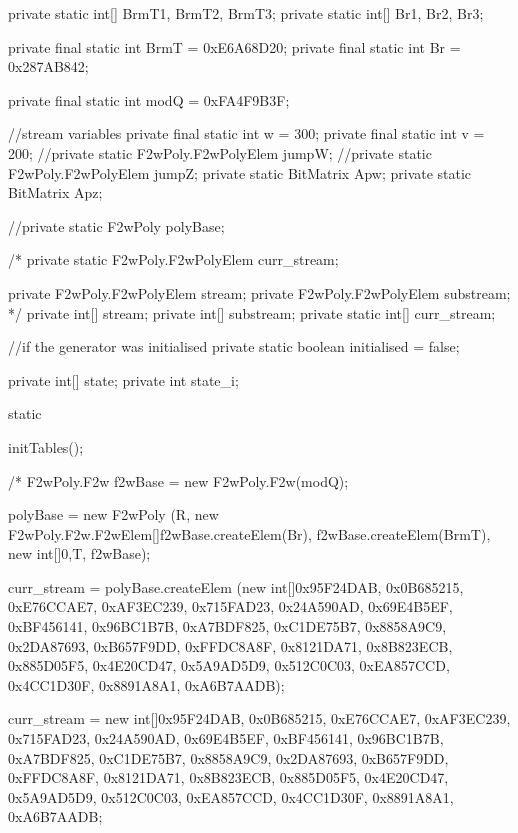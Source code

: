 \begin{code}
\begin{hide}
{   private static int[] BrmT1, BrmT2, BrmT3;
   private static int[] Br1, Br2, Br3;


   private final static int BrmT = 0xE6A68D20;
   private final static int Br = 0x287AB842;

   private final static int modQ = 0xFA4F9B3F;

   //stream variables
   private final static int w = 300;
   private final static int v = 200;
   //private static F2wPoly.F2wPolyElem jumpW;
   //private static F2wPoly.F2wPolyElem jumpZ;
   private static BitMatrix Apw;
   private static BitMatrix Apz;

   //private static F2wPoly polyBase;

   /*
   private static F2wPoly.F2wPolyElem curr_stream;

   private F2wPoly.F2wPolyElem stream;
   private F2wPoly.F2wPolyElem substream;
   */
   private int[] stream;
   private int[] substream;
   private static int[] curr_stream;

   //if the generator was initialised
   private static boolean initialised = false;

   private int[] state;
   private int state_i;


   static
   {
      initTables();

      /*
      F2wPoly.F2w f2wBase = new F2wPoly.F2w(modQ);

      polyBase = new F2wPoly
                 (R, new F2wPoly.F2w.F2wElem[]{f2wBase.createElem(Br),
                                               f2wBase.createElem(BrmT)},
                  new int[]{0,T}, f2wBase);


      curr_stream = polyBase.createElem
                    (new int[]{0x95F24DAB, 0x0B685215, 0xE76CCAE7, 0xAF3EC239,
                               0x715FAD23, 0x24A590AD, 0x69E4B5EF, 0xBF456141,
                               0x96BC1B7B, 0xA7BDF825, 0xC1DE75B7, 0x8858A9C9,
                               0x2DA87693, 0xB657F9DD, 0xFFDC8A8F, 0x8121DA71,
                               0x8B823ECB, 0x885D05F5, 0x4E20CD47, 0x5A9AD5D9,
                               0x512C0C03, 0xEA857CCD, 0x4CC1D30F, 0x8891A8A1,
                               0xA6B7AADB});

      curr_stream = new int[]{0x95F24DAB, 0x0B685215, 0xE76CCAE7, 0xAF3EC239,
                              0x715FAD23, 0x24A590AD, 0x69E4B5EF, 0xBF456141,
                              0x96BC1B7B, 0xA7BDF825, 0xC1DE75B7, 0x8858A9C9,
                              0x2DA87693, 0xB657F9DD, 0xFFDC8A8F, 0x8121DA71,
                              0x8B823ECB, 0x885D05F5, 0x4E20CD47, 0x5A9AD5D9,
                              0x512C0C03, 0xEA857CCD, 0x4CC1D30F, 0x8891A8A1,
                              0xA6B7AADB};

}}
\end{hide}
\end{code}
